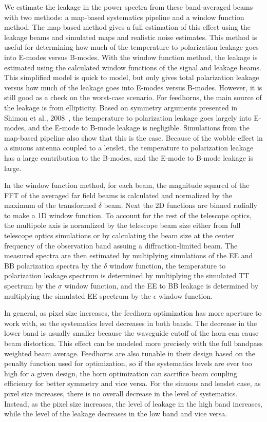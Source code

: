 We estimate the leakage in the power spectra from these band-averaged beams with two methods: a map-based systematics pipeline and a window function method. The map-based method gives a full estimation of this effect using the leakage beams and simulated maps and realistic noise estimates. This method is useful for determining how much of the temperature to polarization leakage goes into E-modes versus B-modes. With the window function method, the leakage is estimated using the calculated window functions of the signal and leakage beams. This simplified model is quick to model, but only gives total polarization leakage versus how much of the leakage goes into E-modes versus B-modes. However, it is still good as a check on the worst-case scenario. For feedhorns, the main source of the leakage is from ellipticity. Based on symmetry arguments presented in Shimon et al., 2008~\cite{Shimon_2008}, the temperature to polarization leakage goes largely into E-modes, and the E-mode to B-mode leakage is negligible. Simulations from the map-based pipeline also show that this is the case. Because of the wobble effect in a sinuous antenna coupled to a lenslet, the temperature to polarization leakage has a large contribution to the B-modes, and the E-mode to B-mode leakage is large.

In the window function method, for each beam, the magnitude squared of the FFT of the averaged far field beams is calculated and normalized by the maximum of the transformed $\delta$ beam. Next the 2D functions are binned radially to make a 1D window function. To account for the rest of the telescope optics, the multipole axis is noramlized by the telescope beam size either from full telescope optics simulations or by calculating the beam size at the center frequency of the observation band assuing a diffraction-limited beam. The measured spectra are then estimated by multiplying simulations of the EE and BB polarization spectra by the $\delta$ window function, the temperature to polarization leakage spectrum is determined by multiplying the simulated TT spectrum by the $\sigma$ window function, and the EE to BB leakage is determined by multiplying the simulated EE spectrum by the $\epsilon$ window function. 

In general, as pixel size increases, the feedhorn optimization has more aperture to work with, so the systematics level decreases in both bands. The decrease in the lower band is usually smaller because the waveguide cutoff of the horn can cause beam distortion. This effect can be modeled more precisely with the full bandpass weighted beam average. Feedhorns are also tunable in their design based on the penalty function used for optimization, so if the systematics levels are ever too high for a given design, the horn optimization can sacrifice beam coupling efficiency for better symmetry and vice versa. For the sinuous and lenslet case, as pixel size increases, there is no overall decrease in the level of systematics. Instead, as the pixel size increases, the level of leakage in the high band increases, while the level of the leakage decreases in the low band and vice versa.

